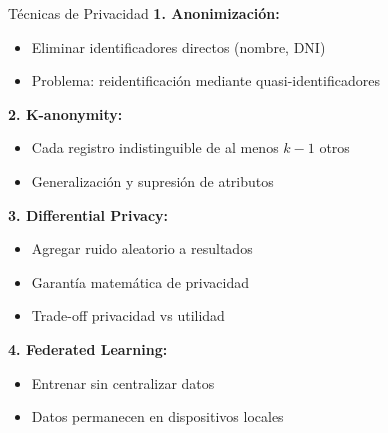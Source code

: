 \documentclass[aspectratio=169]{beamer}
\begin{document}
\begin{frame}{Técnicas de Privacidad}
\textbf{1. Anonimización:}
\begin{itemize}
\item Eliminar identificadores directos (nombre, DNI)
\item Problema: reidentificación mediante quasi-identificadores
\end{itemize}

\vspace{0.2cm}

\textbf{2. K-anonymity:}
\begin{itemize}
\item Cada registro indistinguible de al menos $k-1$ otros
\item Generalización y supresión de atributos
\end{itemize}

\vspace{0.2cm}

\textbf{3. Differential Privacy:}
\begin{itemize}
\item Agregar ruido aleatorio a resultados
\item Garantía matemática de privacidad
\item Trade-off privacidad vs utilidad
\end{itemize}

\vspace{0.2cm}

\textbf{4. Federated Learning:}
\begin{itemize}
\item Entrenar sin centralizar datos
\item Datos permanecen en dispositivos locales
\end{itemize}
\end{frame}
\end{document}
